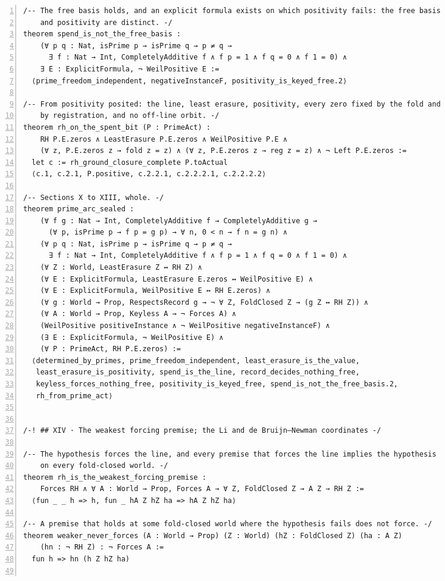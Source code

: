 \documentclass[10pt]{article}
\newcommand{\leansize}{\fontsize{5.5pt}{6.75pt}\selectfont}
\begin{document}
\begin{multicols}{2}
\begin{Verbatim}[numbers=left,firstnumber=1,numbersep=3pt,xleftmargin=2.6em,breaklines=true,breakanywhere=true,breakautoindent=false,breakindent=1.4em,breaksymbolleft={},breakanywheresymbolpre={},fontsize=\leansize]
/-- The free basis holds, and an explicit formula exists on which positivity fails: the free basis
    and positivity are distinct. -/
theorem spend_is_not_the_free_basis :
    (∀ p q : Nat, isPrime p → isPrime q → p ≠ q →
      ∃ f : Nat → Int, CompletelyAdditive f ∧ f p = 1 ∧ f q = 0 ∧ f 1 = 0) ∧
    ∃ E : ExplicitFormula, ¬ WeilPositive E :=
  ⟨prime_freedom_independent, negativeInstanceF, positivity_is_keyed_free.2⟩

/-- From positivity posited: the line, least erasure, positivity, every zero fixed by the fold and
    by registration, and no off-line orbit. -/
theorem rh_on_the_spent_bit (P : PrimeAct) :
    RH P.E.zeros ∧ LeastErasure P.E.zeros ∧ WeilPositive P.E ∧
    (∀ z, P.E.zeros z → fold z = z) ∧ (∀ z, P.E.zeros z → reg z = z) ∧ ¬ Left P.E.zeros :=
  let c := rh_ground_closure_complete P.toActual
  ⟨c.1, c.2.1, P.positive, c.2.2.1, c.2.2.2.1, c.2.2.2.2⟩

/-- Sections X to XIII, whole. -/
theorem prime_arc_sealed :
    (∀ f g : Nat → Int, CompletelyAdditive f → CompletelyAdditive g →
      (∀ p, isPrime p → f p = g p) → ∀ n, 0 < n → f n = g n) ∧
    (∀ p q : Nat, isPrime p → isPrime q → p ≠ q →
      ∃ f : Nat → Int, CompletelyAdditive f ∧ f p = 1 ∧ f q = 0 ∧ f 1 = 0) ∧
    (∀ Z : World, LeastErasure Z ↔ RH Z) ∧
    (∀ E : ExplicitFormula, LeastErasure E.zeros ↔ WeilPositive E) ∧
    (∀ E : ExplicitFormula, WeilPositive E ↔ RH E.zeros) ∧
    (∀ g : World → Prop, RespectsRecord g → ¬ ∀ Z, FoldClosed Z → (g Z ↔ RH Z)) ∧
    (∀ A : World → Prop, Keyless A → ¬ Forces A) ∧
    (WeilPositive positiveInstance ∧ ¬ WeilPositive negativeInstanceF) ∧
    (∃ E : ExplicitFormula, ¬ WeilPositive E) ∧
    (∀ P : PrimeAct, RH P.E.zeros) :=
  ⟨determined_by_primes, prime_freedom_independent, least_erasure_is_the_value,
   least_erasure_is_positivity, spend_is_the_line, record_decides_nothing_free,
   keyless_forces_nothing_free, positivity_is_keyed_free, spend_is_not_the_free_basis.2,
   rh_from_prime_act⟩


/-! ## XIV · The weakest forcing premise; the Li and de Bruijn–Newman coordinates -/

/-- The hypothesis forces the line, and every premise that forces the line implies the hypothesis
    on every fold-closed world. -/
theorem rh_is_the_weakest_forcing_premise :
    Forces RH ∧ ∀ A : World → Prop, Forces A → ∀ Z, FoldClosed Z → A Z → RH Z :=
  ⟨fun _ _ h => h, fun _ hA Z hZ ha => hA Z hZ ha⟩

/-- A premise that holds at some fold-closed world where the hypothesis fails does not force. -/
theorem weaker_never_forces (A : World → Prop) (Z : World) (hZ : FoldClosed Z) (ha : A Z)
    (hn : ¬ RH Z) : ¬ Forces A :=
  fun h => hn (h Z hZ ha)


\end{Verbatim}
\end{multicols}
\end{document}
